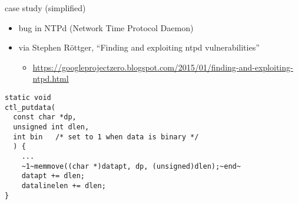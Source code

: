 \usetikzlibrary{arrows.meta,patterns}
\begin{frame}[fragile,label=ntpStudyIntro]{case study (simplified)}
    \begin{itemize}
    \item bug in NTPd (Network Time Protocol Daemon)
    \item via Stephen R\"ottger, ``Finding and exploiting ntpd vulnerabilities''
        \begin{itemize}
        \item \url{https://googleprojectzero.blogspot.com/2015/01/finding-and-exploiting-ntpd.html}
        \end{itemize}
    \end{itemize}
\begin{lstlisting}
static void
ctl_putdata(
  const char *dp,
  unsigned int dlen,
  int bin   /* set to 1 when data is binary */
  ) {
    ...
    ~1~memmove((char *)datapt, dp, (unsigned)dlen);~end~
    datapt += dlen;
    datalinelen += dlen;
}
\end{lstlisting}
\end{frame}

